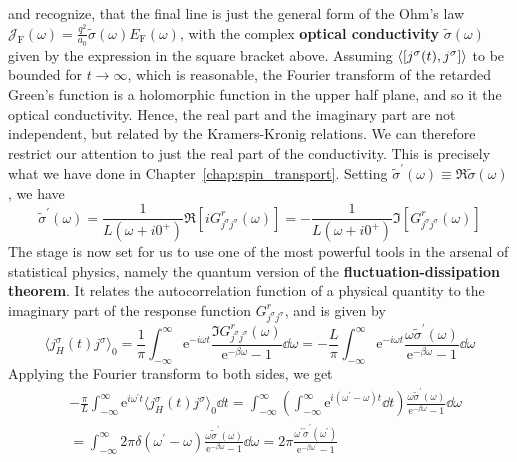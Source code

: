and recognize, that the final line is just the general form of the Ohm's law \(\mathcal{J}_{\text{F} }(\omega ) = \frac{q^2}{a_0}\tilde{\sigma}(\omega)E_{\text{F} }(\omega )\),
with the complex \textbf{optical conductivity} \(\tilde{\sigma} (\omega )\) given by the expression in the square bracket above.
Assuming \(\langle \comm{j^{\sigma }(t)}{j^{\sigma }} \rangle \) to be bounded for \(t \to \infty \), which is reasonable,
the Fourier transform of the retarded Green's function is a holomorphic function in the upper half plane, and so it
the optical conductivity. Hence, the real part and the imaginary part are not independent, but related by the Kramers-Kronig relations.
We can therefore restrict our attention to just the real part of the conductivity. This is precisely what we have done
in Chapter~\ref{chap:spin_transport}. Setting \(\tilde{\sigma}^{\prime}(\omega ) \equiv \Re \tilde{\sigma}(\omega )\), we have
\begin{equation}
    \tilde{\sigma}^{\prime}(\omega ) = \frac{1}{L(\omega + i 0^{+})} \Re \left[ i G^r_{j^{\sigma }j^{\sigma }}(\omega ) \right]
    = - \frac{1}{L(\omega + i 0^{+})} \Im \left[ G^r_{j^{\sigma }j^{\sigma }}(\omega ) \right]
\end{equation}
The stage is now set for us to use one of the most powerful tools in the arsenal of statistical physics, namely the
quantum version of the \textbf{fluctuation-dissipation theorem}. It relates the autocorrelation function of a physical quantity
to the imaginary part of the response function \(G^r_{j^{\sigma }j^{\sigma }}\), and is given by
\begin{equation}
    \langle j^{\sigma }_{H}(t) j^{\sigma } \rangle_0 = \frac{1}{\pi } \int_{-\infty }^{\infty } 
    \mathrm{e}^{-i \omega  t} \frac{\Im G^r_{j^{\sigma }j^{\sigma }}(\omega )}{\mathrm{e}^{-\beta \omega } -1}\dd{\omega } 
    = -\frac{L}{\pi } \int_{-\infty }^{\infty }  \mathrm{e}^{-i \omega  t} \frac{\omega \tilde{\sigma }^{\prime} (\omega )}{\mathrm{e}^{-\beta  \omega } - 1 }\dd{\omega } 
\end{equation}
Applying the Fourier transform to both sides, we get
\begin{align}
     & -\frac{\pi}{L} \int_{-\infty }^{\infty }  \mathrm{e}^{i \omega^{\prime}  t} \langle j^{\sigma }_{H}(t) j^{\sigma } \rangle_0 \dd{t} =
    \int_{-\infty }^{\infty }  \left(\int_{-\infty}^{\infty}  \mathrm{e}^{i(\omega^{\prime} -\omega )t} \dd{t} \right)
    \frac{\omega \tilde{\sigma}^{\prime} (\omega )}{\mathrm{e}^{-\beta \omega } - 1 }\dd{\omega } \nonumber                                                                               \\
     & =\int_{-\infty}^{\infty}  2\pi  \delta (\omega ^{\prime} -\omega  ) \frac{\omega \tilde{\sigma}^{\prime} (\omega )}{\mathrm{e}^{-\beta \omega } - 1 }\dd{\omega } 
    = 2\pi  \frac{\omega^{\prime} \tilde{\sigma}^{\prime} (\omega^{\prime} )}{\mathrm{e}^{-\beta \omega^{\prime} } - 1 }
\end{align}

